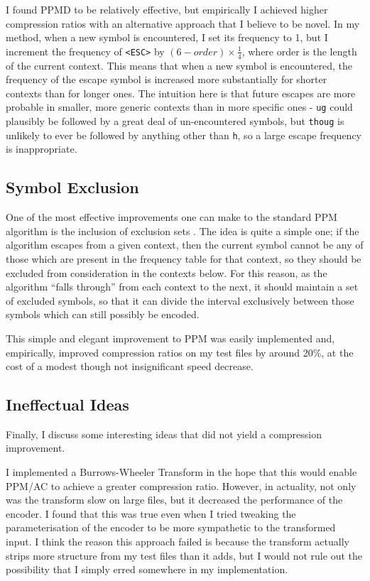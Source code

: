 \documentclass[11pt]{article}
\newcommand{\code}[1]{\texttt{#1}}
\begin{document}
I found PPMD to be relatively effective, but empirically I achieved higher compression ratios with an alternative approach that I believe to be novel. In my method, when a new symbol is encountered, I set its frequency to 1, but I increment the frequency of \code{<ESC>} by $(6 - order) \times \frac{1}{4}$, where order is the length of the current context. This means that when a new symbol is encountered, the frequency of the escape symbol is increased more substantially for shorter contexts than for longer ones. The intuition here is that future escapes are more probable in smaller, more generic contexts than in more specific ones - \code{ug} could plausibly be followed by a great deal of un-encountered symbols, but \code{thoug} is unlikely to ever be followed by anything other than \code{h}, so a large escape frequency is inappropriate.

\subsection{Symbol Exclusion}

One of the most effective improvements one can make to the standard PPM algorithm is the inclusion of exclusion sets \cite{steinruecken2015lossless}. The idea is quite a simple one; if the algorithm escapes from a given context, then the current symbol cannot be any of those which are present in the frequency table for that context, so they should be excluded from consideration in the contexts below. For this reason, as the algorithm \enquote{falls through} from each context to the next, it should maintain a set of excluded symbols, so that it can divide the interval exclusively between those symbols which can still possibly be encoded.

This simple and elegant improvement to PPM was easily implemented and, empirically, improved compression ratios on my test files by around 20\%, at the cost of a modest though not insignificant speed decrease.

\subsection{Ineffectual Ideas}

Finally, I discuss some interesting ideas that did not yield a compression improvement.

I implemented a Burrows-Wheeler Transform in the hope that this would enable PPM/AC to achieve a greater compression ratio. However, in actuality, not only was the transform slow on large files, but it decreased the performance of the encoder. I found that this was true even when I tried tweaking the parameterisation of the encoder to be more sympathetic to the transformed input. I think the reason this approach failed is because the transform actually strips more structure from my test files than it adds, but I would not rule out the possibility that I simply erred somewhere in my implementation.
\end{document}
